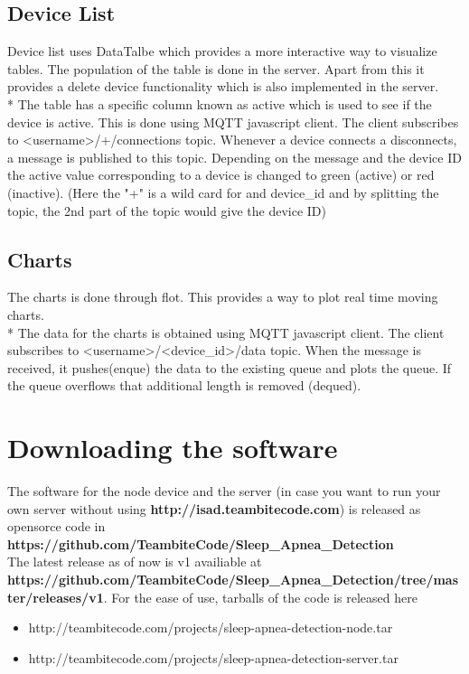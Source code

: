 \documentclass{report}
\begin{document}
\subsection{Device List}
Device list uses DataTalbe which provides a more interactive way to visualize tables. The population of the table is done in the server. Apart from this it provides a delete device functionality which is also implemented in the server.\\*
The table has a specific column known as active which is used to see if the device is active. This is done using MQTT javascript client. The client subscribes to <username>/+/connections topic. Whenever a device connects a disconnects, a message is published to this topic. Depending on the message and the device ID the active value corresponding to a device is changed to green (active) or red (inactive). (Here the "+" is a wild card for and device\_id and by splitting the topic, the 2nd part of the topic would give the device ID)

\subsection{Charts}
The charts is done through flot. This provides a way to plot real time moving charts.\\*
The data for the charts is obtained using MQTT javascript client. The client subscribes to <username>/<device\_id>/data topic. When the message is received, it pushes(enque) the data to the existing queue and plots the queue. If the queue overflows that additional length is removed (dequed).

\section{Downloading the software}

The software for the node device and the server (in case you want to run your own server without using \textbf{http://isad.teambitecode.com}) is released as opensorce code in \textbf{https://github.com/TeambiteCode/Sleep\_Apnea\_Detection}\\
The latest release as of now is v1 availiable at\\ \textbf{https://github.com/TeambiteCode/Sleep\_Apnea\_Detection/tree/master/releases/v1}. For the ease of use, tarballs of the code is released here\\
\begin{itemize}
    \item http://teambitecode.com/projects/sleep-apnea-detection-node.tar
    \item http://teambitecode.com/projects/sleep-apnea-detection-server.tar
\end{itemize}
\end{document}
